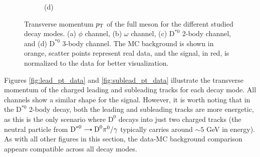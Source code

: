 \begin{figure}[!ht]
\begin{subfigure}[t]{0.50\mylength}
        \vspace*{-0.2cm}
        \caption{\footnotesize (d)}
    \end{subfigure}%
\caption{Transverse momentum $p_\text{T}$ of the full meson for the different studied decay modes. (a) $\phi$ channel, (b) $\omega$ channel, (c) $\text{D}^{*0}$ 2-body channel, and (d) $\text{D}^{*0}$ 3-body channel. The MC background is shown in orange, scatter points represent real data, and the signal, in red, is normalized to the data for better visualization.}
\label{fig:full_pt_data}
    \vspace*{-0.0cm}
\end{figure}

\newpage

\clearpage

Figures \ref{fig:lead_pt_data} and \ref{fig:sublead_pt_data} illustrate the transverse momentum of the charged leading and subleading tracks for each decay mode. All channels show a similar shape for the signal. However, it is worth noting that in the $\text{D}^{*0}$ 2-body decay, both the leading and subleading tracks are more energetic, as this is the only scenario where $\text{D}^{0}$ decays into just two charged tracks (the neutral particle from $\text{D}^{*0}\decaysto \text{D}^{0}\pi^{0}/\gamma$ typically carries around $\sim5$ GeV in energy). As with all other figures in this section, the data-MC background comparison appears compatible across all decay modes.

